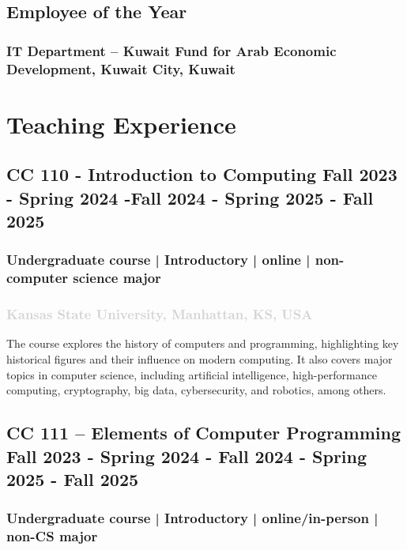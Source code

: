 \documentclass[11pt]{article}
\begin{document}
\subsection{Employee of the Year }
\subsubsection{IT Department – Kuwait Fund for Arab Economic Development, Kuwait City, Kuwait }

\vspace{2em} %


\section{Teaching Experience}
\label{sec:CC110} 
\subsection{ CC 110 - Introduction to Computing  \hfill  \normalfont  Fall 2023 - Spring 2024 -Fall 2024 - Spring 2025 - Fall 2025 } 
 \subsubsection{ Undergraduate course | Introductory | online | non-computer science major   }
  \subsubsection{ \textcolor{lightgray}{\normalfont Kansas State University, Manhattan, KS, USA   }}
 \vspace{0.2em} %
  \noindent
The course explores the history of computers and programming, highlighting key historical figures and their influence on modern computing. It also covers major topics in computer science, including artificial intelligence, high-performance computing, cryptography, big data, cybersecurity, and robotics, among others. 

\label{sec:CC111} 
\vspace{0.8em} %

   \subsection{ CC 111 – Elements of Computer Programming \hfill \normalfont Fall 2023 - Spring 2024 - Fall 2024 - Spring 2025  - Fall 2025}
    \subsubsection{ Undergraduate course | Introductory | online/in-person | non-CS major   }
\end{document}
